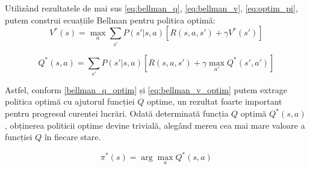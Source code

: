Utilizând rezultatele de mai sus \ref{eq:bellman_q}, \ref{eq:bellman_v}, \ref{eq:optim_pi}, putem construi ecuațiile Bellman pentru politica optimă:
\begin{equation}
    V^*(s) = \max_a \sum_{s\prime} P(s\prime|s,a)[R(s,a,s\prime) + \gamma V^*(s\prime)]
\label{eq:bellman_v_optim}
\end{equation}

\begin{equation}
    Q^*(s,a) = \sum_{s\prime} P(s\prime|s,a)[R(s,a,s\prime) + \gamma \max_{a\prime} Q^*(s\prime,a\prime)]
\label{bellman_q_optim}
\end{equation}

Astfel, conform \ref{bellman_q_optim} și \ref{eq:bellman_v_optim} putem extrage politica optimă cu ajutorul funcției $Q$ optime, un rezultat foarte important pentru progresul curentei lucrări. Odată determinată funcția $Q$ optimă $Q^*(s, a)$, obținerea politicii optime devine trivială, alegând mereu cea mai mare valoare a funcției $Q$ în fiecare stare.

\begin{equation*}
    \pi^*(s) = \arg\max_a Q^*(s,a)
\end{equation*}